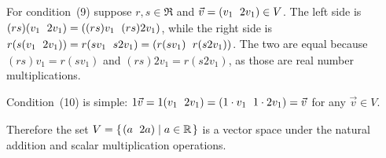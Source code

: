 \documentclass[10pt,t]{beamer}
\begin{document}
\begin{frame}
\pause
For condition~(9) suppose $r,s\in\Re$ and $\vec{v}=\rowvec{v_1 &2v_1}\in V$.
The left side is $(rs)\rowvec{v_1 &2v_1}=\rowvec{(rs)v_1 &(rs)2v_1}$, while the
right side is 
$r(s\rowvec{v_1 &2v_1})=r\rowvec{sv_1 &s2v_1}=\rowvec{r(sv_1) &r(s2v_1)}$.
The two are equal because
$(rs)v_1=r(sv_1)$ and $(rs)2v_1=r(s2v_1)$, 
as those are real number multiplications.   

\pause
Condition~(10) is simple:
$1\vec{v}=1\rowvec{v_1 &2v_1}=\rowvec{1\cdot v_1 &1\cdot 2v_1}=\vec{v}$
for any $\vec{v}\in V$.

\pause\medskip
Therefore the set
$V=\set{\rowvec{a  &2a}\suchthat a\in\Re}$
is a vector space under the natural addition and scalar multiplication 
operations.
\end{frame}
\end{document}
